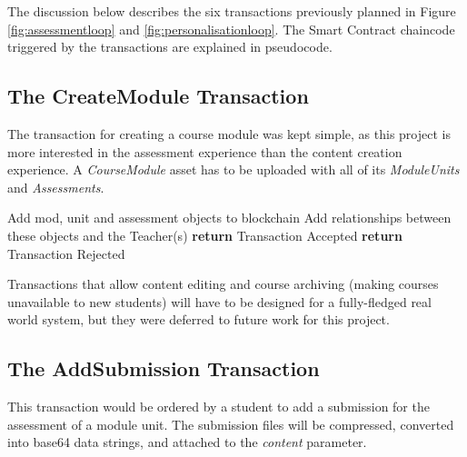 The discussion below describes the six transactions previously planned in Figure \ref{fig:assessmentloop} and \ref{fig:personalisationloop}.
The Smart Contract chaincode triggered by the transactions are explained in pseudocode.

\subsection{The CreateModule Transaction}

The transaction for creating a course module was kept simple, as this project is more interested in the assessment experience than the
content creation experience. A \textit{CourseModule} asset has to be uploaded with all of its \textit{ModuleUnits} and \textit{Assessments}.

\begin{algorithm}
	\begin{algorithmic}[0]
		\State Add mod, unit and assessment objects to blockchain
		\State Add relationships between these objects and the Teacher(s)
		\State \textbf{return} Transaction Accepted
		\Else
		\State \textbf{return} Transaction Rejected
		\EndIf
		\EndFunction
	\end{algorithmic}
\end{algorithm}

Transactions that allow content editing and course archiving (making courses unavailable to new students) will have to be designed
for a fully-fledged real world system, but they were deferred to future work for this project.

\subsection{The AddSubmission Transaction}

This transaction would be ordered by a student to add a submission for the assessment of a module unit. 
The submission files will be compressed, converted into base64 data strings, and attached to the \textit{content} parameter.

